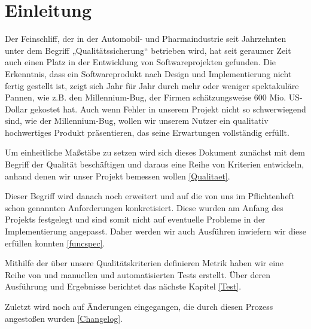 \chapter{Einleitung} \label{Einleitung}

Der Feinschliff, der in der Automobil- und Pharmaindustrie seit Jahrzehnten unter dem Begriff „Qualitätssicherung“ betrieben wird, hat seit geraumer Zeit auch einen Platz in der Entwicklung von Softwareprojekten gefunden.
Die Erkenntnis, dass ein Softwareprodukt nach Design und Implementierung nicht fertig gestellt ist, zeigt sich Jahr für Jahr durch mehr oder weniger spektakuläre Pannen, wie z.B. den Millennium-Bug, der Firmen schätzungsweise 600 Mio. US-Dollar gekostet hat. Auch wenn Fehler in unserem Projekt nicht so schwerwiegend sind, wie der Millennium-Bug, wollen wir unserem Nutzer ein qualitativ hochwertiges Produkt präsentieren, das seine Erwartungen vollständig erfüllt. \\ \par
Um einheitliche Maßstäbe zu setzen wird sich dieses Dokument zunächst mit dem Begriff der Qualität beschäftigen und daraus eine Reihe von Kriterien entwickeln, anhand denen wir unser Projekt bemessen wollen \eqref{Qualitaet}. \\
\par
Dieser Begriff wird danach noch erweitert und auf die von uns im Pflichtenheft schon genannten Anforderungen konkretisiert. Diese wurden am Anfang des Projekts festgelegt und sind somit nicht auf eventuelle Probleme in der Implementierung angepasst. Daher werden wir auch Ausführen inwiefern wir diese erfüllen konnten \eqref{funcspec}. \\
\par
Mithilfe der über unsere Qualitätskriterien definieren Metrik haben wir eine Reihe von und manuellen und automatisierten Tests erstellt. Über deren Ausführung und Ergebnisse berichtet das nächste Kapitel \eqref{Test}. \\
\par
Zuletzt wird noch auf Änderungen eingegangen, die durch diesen Prozess angestoßen wurden \eqref{Changelog}.